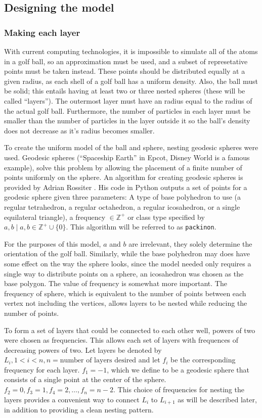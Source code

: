 \documentclass{article}
\begin{document}
\subsection{Designing the model}

\subsubsection{Making each layer}
With current computing technologies, it is impossible to simulate all of the atoms in a golf ball, so an approximation must be used, and a subset of represetative points must be taken instead. These points should be distributed equally at a given radius, as each shell of a golf ball has a uniform density. Also, the ball must be solid; this entails having at least two or three nested spheres (these will be called ``layers''). The outermost layer must have an radius equal to the radius of the actual golf ball. Furthermore, the number of particles in each layer must be smaller than the number of particles in the layer outside it so the ball's density does not decrease as it's radius becomes smaller.

To create the uniform model of the ball and sphere, nesting geodesic spheres were used. Geodesic spheres (``Spaceship Earth'' in Epcot, Disney World is a famous example), solve this problem by allowing the placement of a finite number of points uniformly on the sphere. An algorithm for creating geodesic spheres is provided by Adrian Rossiter \cite{packinon}. His code in Python outputs a set of points for a geodesic sphere given three parameters: A type of base polyhedron to use (a regular tetrahedron, a regular octahedron, a regular icosahedron, or a single equilateral triangle), a frequency $\in \mathbb{Z^{+}}$ or class type specified by $a, b \mid a, b \in \mathbb{Z^{+}} \cup \{0\}$. This algorithm will be referred to as \texttt{packinon}.

For the purposes of this model, $a$ and $b$ are irrelevant, they solely determine the orientation of the golf ball. Similarly, while the base polyhedron may does have some ef\mbox{f}ect on the way the sphere looks, since the model needed only requires a single way to distribute points on a sphere, an icosahedron was chosen as the base polygon. The value of frequency is somewhat more important. The frequency of sphere, which is equivalent to the number of points between each vertex not including the vertices, allows layers to be nested while reducing the number of points.

To form a set of layers that could be connected to each other well, powers of two were chosen as frequencies. This allows each set of layers with frequences of decreasing powers of two. Let layers be denoted by $L_i, 1 < i < n, n = \text{number of layers desired}$ and let $f_{i}$ be the corresponding frequency for each layer. $f_{1} = -1$, which we define to be a geodesic sphere that consists of a single point at the center of the sphere. $f_{2} = 0, f_{3} = 1, f_{4} = 2, \ldots, f_{n} = n - 2$. This choice of frequencies for nesting the layers provides a convenient way to connect $L_{i}$ to $L_{i + 1}$ as will be described later, in addition to providing a clean nesting pattern.
\end{document}
